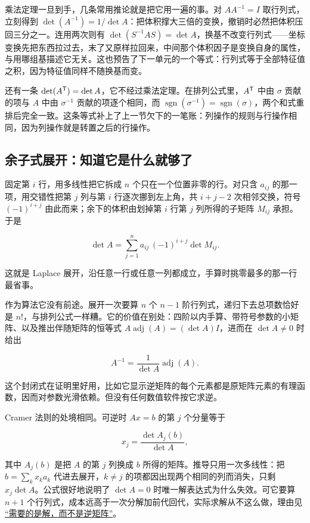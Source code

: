 乘法定理一旦到手，几条常用推论就是把它用一遍的事。对 \(AA^{-1}=I\) 取行列式，立刻得到 \(\det(A^{-1})=1/\det A\)：把体积撑大三倍的变换，撤销时必然把体积压回三分之一。连用两次则有 \(\det(S^{-1}AS)=\det A\)，换基不改变行列式——坐标变换先把东西拉过去，末了又原样拉回来，中间那个体积因子是变换自身的属性，与用哪组基描述它无关。这也预告了下一单元的一个等式：行列式等于全部特征值之积，因为特征值同样不随换基而变。

还有一条 \(\det(A^{\mathsf{T}})=\det A\)，它不经过乘法定理。在排列公式里，\(A^{\mathsf{T}}\) 中由 \(\sigma\) 贡献的项与 \(A\) 中由 \(\sigma^{-1}\) 贡献的项逐个相同，而 \(\operatorname{sgn}(\sigma^{-1})=\operatorname{sgn}(\sigma)\)，两个和式重排后完全一致。这条等式补上了上一节欠下的一笔账：列操作的规则与行操作相同，因为列操作就是转置之后的行操作。

\subsection{余子式展开：知道它是什么就够了}

固定第 \(i\) 行，用多线性把它拆成 \(n\) 个只在一个位置非零的行。对只含 \(a_{ij}\) 的那一项，用交错性把第 \(j\) 列与第 \(i\) 行逐次挪到左上角，共 \(i+j-2\) 次相邻交换，符号 \((-1)^{i+j}\) 由此而来；余下的体积由划掉第 \(i\) 行第 \(j\) 列所得的子矩阵 \(M_{ij}\) 承担。于是

\[
\det A=\sum_{j=1}^n a_{ij}\,(-1)^{i+j}\det M_{ij}.
\]

这就是 Laplace 展开，沿任意一行或任意一列都成立，手算时挑零最多的那一行最省事。

作为算法它没有前途。展开一次要算 \(n\) 个 \(n-1\) 阶行列式，递归下去总项数恰好是 \(n!\)，与排列公式一样糟。它的价值在别处：四阶以内手算、带符号参数的小矩阵、以及推出伴随矩阵的恒等式 \(A\operatorname{adj}(A)=(\det A)I\)，进而在 \(\det A\neq0\) 时给出

\[
A^{-1}=\frac{1}{\det A}\operatorname{adj}(A).
\]

这个封闭式在证明里好用，比如它显示逆矩阵的每个元素都是原矩阵元素的有理函数，因而对参数光滑依赖。但没有任何数值软件按它求逆。

Cramer 法则的处境相同。可逆时 \(Ax=b\) 的第 \(j\) 个分量等于

\[
x_j=\frac{\det A_j(b)}{\det A},
\]

其中 \(A_j(b)\) 是把 \(A\) 的第 \(j\) 列换成 \(b\) 所得的矩阵。推导只用一次多线性：把 \(b=\sum_k x_ka_k\) 代进去展开，\(k\neq j\) 的项都因出现两个相同的列而消失，只剩 \(x_j\det A\)。公式很好地说明了 \(\det A=0\) 时唯一解表达式为什么失效。可它要算 \(n+1\) 个行列式，成本远高于一次分解加前代回代，实际求解从不这么做，理由见 \hyperref[sec:08-Numerical-Analysis/07-Numerical-Methods-for-ML/03]{``需要的是解，而不是逆矩阵''}。

